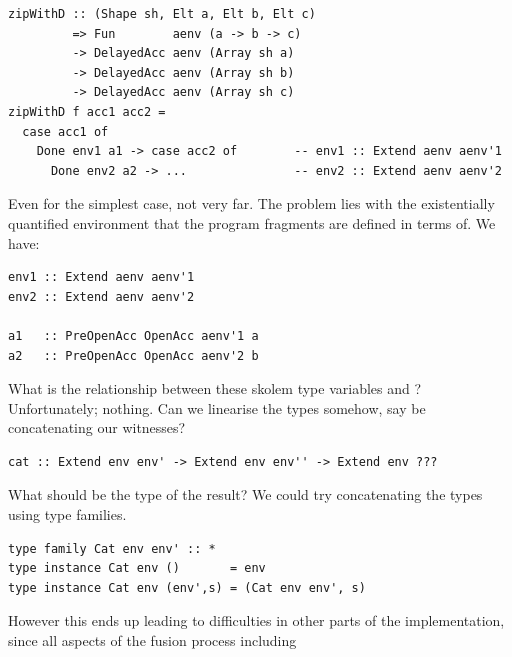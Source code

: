 %
%
%
\begin{lstlisting}[style=haskell]
zipWithD :: (Shape sh, Elt a, Elt b, Elt c)
         => Fun        aenv (a -> b -> c)
         -> DelayedAcc aenv (Array sh a)
         -> DelayedAcc aenv (Array sh b)
         -> DelayedAcc aenv (Array sh c)
zipWithD f acc1 acc2 =
  case acc1 of
    Done env1 a1 -> case acc2 of        -- env1 :: Extend aenv aenv'1
      Done env2 a2 -> ...               -- env2 :: Extend aenv aenv'2
\end{lstlisting}
%
Even for the simplest case, not very far. The problem lies with the
existentially quantified environment that the program fragments are defined in
terms of. We have:
%
\begin{lstlisting}[style=haskell]
env1 :: Extend aenv aenv'1
env2 :: Extend aenv aenv'2

a1   :: PreOpenAcc OpenAcc aenv'1 a
a2   :: PreOpenAcc OpenAcc aenv'2 b
\end{lstlisting}
%
What is the relationship between these skolem type variables  and
? Unfortunately; nothing. Can we linearise the types somehow, say
be concatenating our witnesses?
%
%
\begin{lstlisting}[style=haskell]
cat :: Extend env env' -> Extend env env'' -> Extend env ???
\end{lstlisting}
%
What should be the type of the result? We could try concatenating the types
using type families.
%
\begin{lstlisting}[style=haskell]
type family Cat env env' :: *
type instance Cat env ()       = env
type instance Cat env (env',s) = (Cat env env', s)
\end{lstlisting}
%
However this ends up leading to difficulties in other parts of the
implementation, since all aspects of the fusion process including
